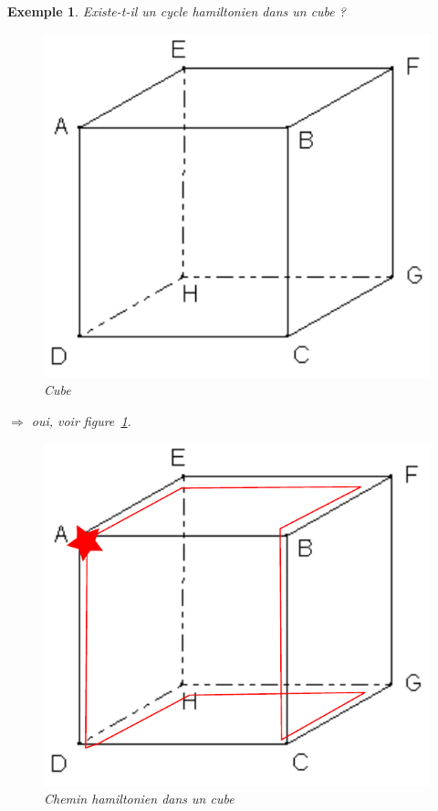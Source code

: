 \documentclass{article}
\newtheorem{exemple}{Exemple}[section]
\begin{document}
\begin{sffamily}
\begin{exemple} Existe-t-il un cycle hamiltonien dans un cube ? \\
\begin{figure}[h!]
    \begin{center}
    \includegraphics[scale=0.3]{cube.pdf}
    \caption{Cube}
    \end{center}
\end{figure}
$\Longrightarrow$ oui, voir figure~\ref{chcube}.
\begin{figure}[h!]
    \begin{center}
    \includegraphics[scale=0.3]{cubehc.pdf}
    \caption{Chemin hamiltonien dans un cube}
    \label{chcube}
    \end{center}
\end{figure}


\end{exemple}
\end{sffamily}
\end{document}
